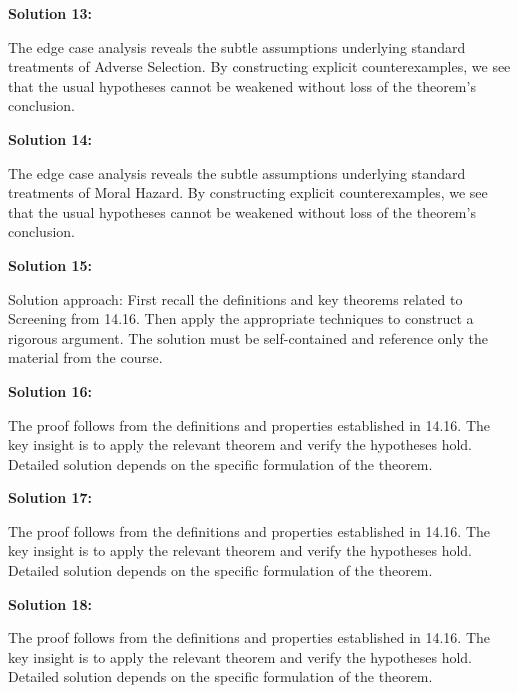 \documentclass[12pt,a4paper]{exam}
\begin{document}
\vspace{0.5cm}

\textbf{Solution 13:}

The edge case analysis reveals the subtle assumptions underlying standard treatments of Adverse Selection. By constructing explicit counterexamples, we see that the usual hypotheses cannot be weakened without loss of the theorem's conclusion.

\vspace{0.5cm}

\textbf{Solution 14:}

The edge case analysis reveals the subtle assumptions underlying standard treatments of Moral Hazard. By constructing explicit counterexamples, we see that the usual hypotheses cannot be weakened without loss of the theorem's conclusion.

\vspace{0.5cm}

\textbf{Solution 15:}

Solution approach: First recall the definitions and key theorems related to Screening from 14.16. Then apply the appropriate techniques to construct a rigorous argument. The solution must be self-contained and reference only the material from the course.

\vspace{0.5cm}

\textbf{Solution 16:}

The proof follows from the definitions and properties established in 14.16. The key insight is to apply the relevant theorem and verify the hypotheses hold. Detailed solution depends on the specific formulation of the theorem.

\vspace{0.5cm}

\textbf{Solution 17:}

The proof follows from the definitions and properties established in 14.16. The key insight is to apply the relevant theorem and verify the hypotheses hold. Detailed solution depends on the specific formulation of the theorem.

\vspace{0.5cm}

\textbf{Solution 18:}

The proof follows from the definitions and properties established in 14.16. The key insight is to apply the relevant theorem and verify the hypotheses hold. Detailed solution depends on the specific formulation of the theorem.
\end{document}
